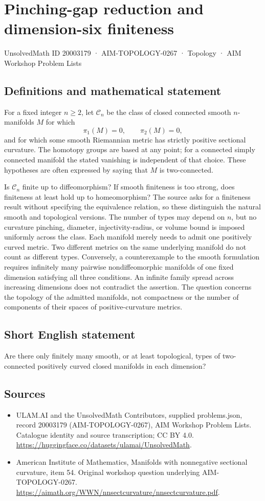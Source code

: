 \documentclass[11pt,a4paper]{article}
\begin{document}
\section*{Pinching-gap reduction and dimension-six finiteness}\label{20003179}
{\small UnsolvedMath ID 20003179 · AIM-TOPOLOGY-0267 · Topology · AIM Workshop Problem Lists}
\subsection{Definitions and mathematical statement}
For a fixed integer $n\geq2$, let $\mathcal C_n$ be the class of closed connected smooth $n$-manifolds $M$ for which
\[
 \pi_1(M)=0,\qquad \pi_2(M)=0,
\]
and for which some smooth Riemannian metric has strictly positive sectional curvature.
The homotopy groups are based at any point; for a connected simply connected manifold the stated vanishing is independent of that choice.
These hypotheses are often expressed by saying that $M$ is two-connected.

Is $\mathcal C_n$ finite up to diffeomorphism?
If smooth finiteness is too strong, does finiteness at least hold up to homeomorphism?
The source asks for a finiteness result without specifying the equivalence relation, so these distinguish the natural smooth and topological versions.
The number of types may depend on $n$, but no curvature pinching, diameter, injectivity-radius, or volume bound is imposed uniformly across the class.
Each manifold merely needs to admit one positively curved metric.
Two different metrics on the same underlying manifold do not count as different types.
Conversely, a counterexample to the smooth formulation requires infinitely many pairwise nondiffeomorphic manifolds of one fixed dimension satisfying all three conditions.
An infinite family spread across increasing dimensions does not contradict the assertion.
The question concerns the topology of the admitted manifolds, not compactness or the number of components of their spaces of positive-curvature metrics.
\subsection{Short English statement}
Are there only finitely many smooth, or at least topological, types of two-connected positively curved closed manifolds in each dimension?
\subsection{Sources}
\begin{itemize}
\item[S1] ULAM.AI and the UnsolvedMath Contributors, supplied problems.json, record 20003179 (AIM-TOPOLOGY-0267), AIM Workshop Problem Lists. Catalogue identity and source transcription; CC BY 4.0.
\url{https://huggingface.co/datasets/ulamai/UnsolvedMath}.
\item[S2] American Institute of Mathematics, Manifolds with nonnegative sectional curvature, item 54. Original workshop question underlying AIM-TOPOLOGY-0267.
\url{https://aimath.org/WWN/nnsectcurvature/nnsectcurvature.pdf}.
\end{itemize}
\end{document}

